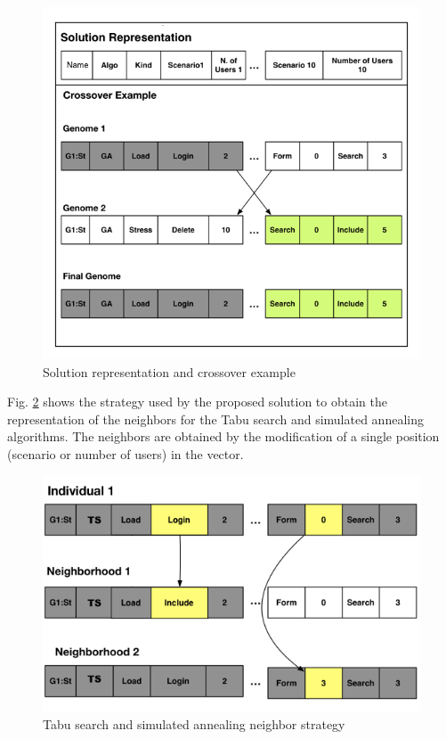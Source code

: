 \begin{figure}[h]
\centering
\includegraphics[width=1\textwidth]{./images/genomerepresentation1.png}
\caption{Solution representation and crossover example}
\label{fig:genomarepresentation}
\end{figure}

Fig. \ref{fig:neighbourtaby} shows the strategy used by the proposed solution to obtain the representation of the neighbors for the Tabu search and simulated annealing algorithms. The neighbors are obtained by the modification of a single position (scenario or number of users) in the vector.


\begin{figure}[h]
\centering
\includegraphics[width=1\textwidth]{./images/neighbor.png}
\caption{Tabu search and simulated annealing neighbor strategy}
\label{fig:neighbourtaby}
\end{figure}


